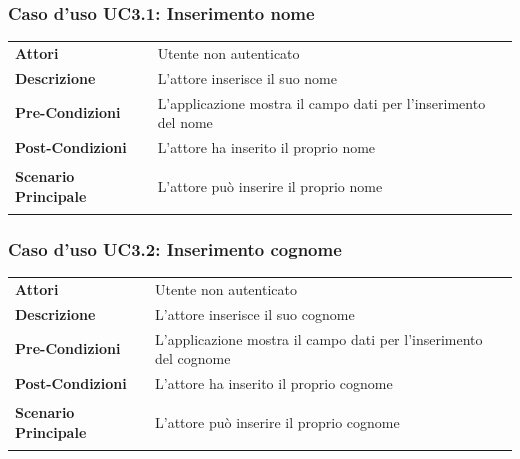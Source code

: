\subsubsection{Caso d'uso UC3.1: Inserimento nome}
\label{UC3_1}

\begin{longtable}{ l | p{11cm}}
	\hline
	\rowcolor{Gray}
	 \multicolumn{2}{c}{UC3.1 - Inserimento nome} \\
	 \hline
	\textbf{Attori} & Utente non autenticato \\
	\textbf{Descrizione} & L'attore inserisce il suo nome \\
	\textbf{Pre-Condizioni} & L'applicazione mostra il campo dati per l'inserimento del nome \\
	\textbf{Post-Condizioni} & L'attore ha inserito il proprio nome \\
	\textbf{Scenario Principale} & 
	\begin{enumerate*}[label=(\arabic*.),itemjoin={\newline}]
		\item L'attore può inserire il proprio nome
	\end{enumerate*}\\
\end{longtable}

\subsubsection{Caso d'uso UC3.2: Inserimento cognome}
\label{UC3_2}

\begin{longtable}{ l | p{11cm}}
	\hline
	\rowcolor{Gray}
	 \multicolumn{2}{c}{UC3.2 - Inserimento cognome} \\
	 \hline
	\textbf{Attori} & Utente non autenticato \\
	\textbf{Descrizione} & L'attore inserisce il suo cognome \\
	\textbf{Pre-Condizioni} & L'applicazione mostra il campo dati per l'inserimento del cognome \\
	\textbf{Post-Condizioni} & L'attore ha inserito il proprio cognome \\
	\textbf{Scenario Principale} & 
	\begin{enumerate*}[label=(\arabic*.),itemjoin={\newline}]
		\item L'attore può inserire il proprio cognome
	\end{enumerate*}\\
\end{longtable}

